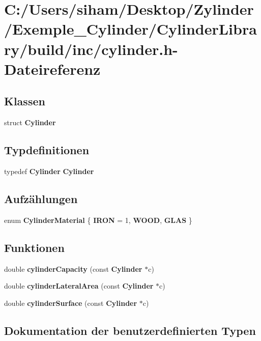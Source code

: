 \section{C:/Users/siham/Desktop/Zylinder/Exemple\_\-Cylinder/Cylinder\-Library/build/inc/cylinder.h-Dateireferenz}
\label{build_2inc_2cylinder_8h}
\subsection*{Klassen}
\begin{CompactItemize}
\item 
struct {\bf Cylinder}
\end{CompactItemize}
\subsection*{Typdefinitionen}
\begin{CompactItemize}
\item 
typedef {\bf Cylinder} {\bf Cylinder}
\end{CompactItemize}
\subsection*{Aufz\"{a}hlungen}
\begin{CompactItemize}
\item 
enum {\bf Cylinder\-Material} \{ {\bf IRON} =  1, 
{\bf WOOD}, 
{\bf GLAS}
 \}
\end{CompactItemize}
\subsection*{Funktionen}
\begin{CompactItemize}
\item 
double {\bf cylinder\-Capacity} (const {\bf Cylinder} $\ast$c)
\item 
double {\bf cylinder\-Lateral\-Area} (const {\bf Cylinder} $\ast$c)
\item 
double {\bf cylinder\-Surface} (const {\bf Cylinder} $\ast$c)
\end{CompactItemize}


\subsection{Dokumentation der benutzerdefinierten Typen}
